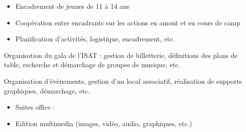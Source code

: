 \documentclass[10pt,a4paper,ragged2e,withhyper,normalphoto]{altacv}
\begin{document}
\begin{paracol}{2}
	\medskip
	
	
	\begin{itemize}
		\item Encadrement de jeunes de 11 à 14 ans
		\item Coopération entre encadrants sur les actions en amont et en cours de camp
		\item Planification d'activités, logistique, encadrement, etc.
	\end{itemize}
	
	Organisation du gala de l'ISAT : gestion de billetterie, définitions des plans de table, recherche et démarchage de groupes de musique, etc.
	
	Organisation d'évènements, gestion d'un local associatif, réalisation de supports graphiques, démarchage, etc.
	
	
	
	
	
	
	
	\begin{itemize}
		\item Suites office : 
		\item Edition multimedia (images, vidéo, audio, graphiques, etc.)
	\end{itemize}
	
	

\end{paracol}
\end{document}
